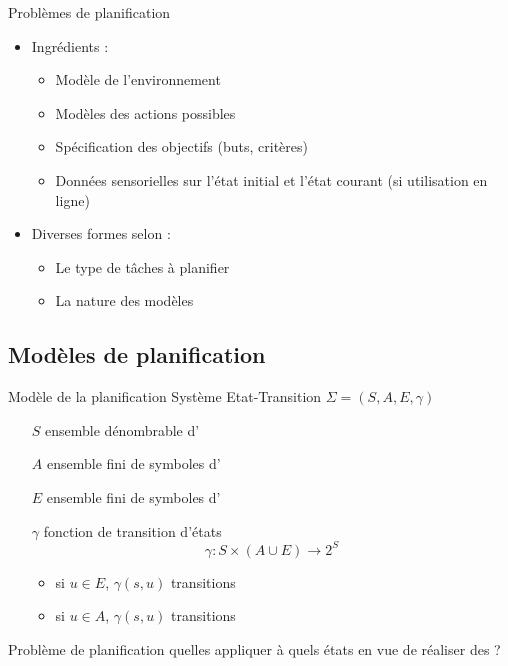 \documentclass[compress]{beamer}
\begin{document}
\begin{frame}{Problèmes de planification}
\begin{itemize}
\item Ingrédients :
	\begin{itemize}
	\item Modèle de l'environnement
	\item Modèles des actions possibles
	\item Spécification des objectifs (buts, critères)
	\item Données sensorielles sur l'état initial et l'état courant (si utilisation en ligne)
	\end{itemize}
\item Diverses formes selon :
	\begin{itemize}
	\item Le type de tâches à planifier
	\item La nature des modèles
	\end{itemize}
\end{itemize}
\end{frame}

\subsection{Modèles de planification}
\begin{frame}{Modèle de la planification}
Système Etat-Transition $\Sigma = (S, A, E, \gamma)$
\begin{itemize}
\item[$S$] ensemble dénombrable d'
\item[$A$] ensemble fini de symboles d'
\item[$E$] ensemble fini de symboles d'
\item[$\gamma$] fonction de transition d'états
	$$\gamma: S \times (A \cup E) \rightarrow 2^S$$
	\begin{itemize}
	\item si $u \in E$, $\gamma(s, u)$ transitions 
	\item si $u \in A$, $\gamma(s, u)$ transitions 
	\end{itemize}
\end{itemize}
\begin{block}{Problème de planification}
quelles  appliquer à quels états en vue de réaliser des  ?
\end{block}
\end{frame}
\end{document}
